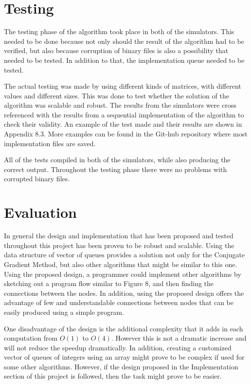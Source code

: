 \documentclass[12pt,a4paper]{article}
\begin{document}
\section{Testing}
The testing phase of the algorithm took place in both of the simulators. This needed to be done because not only should the result of the algorithm had to be verified, but also because corruption of binary files is also a possibility that needed to be tested. In addition to that, the implementation queue needed to be tested.

The actual testing was made by using different kinds of matrices, with different values and different sizes. This was done to test whether the solution of the algorithm was scalable and robust. The results from the simulators were cross referenced with the results from a sequential implementation of the algorithm to check their validity. An example of the test made and their results are shown in Appendix 8.3. More examples can be found in the Git-hub repository where most implementation files are saved\cite{git_repo}.

All of the tests compiled in both of the simulators, while also producing the correct output. Throughout the testing phase there were no problems with corrupted binary files.
\section{Evaluation}
In general the design and implementation that has been proposed and tested throughout this project has been proven to be robust and scalable. Using the data structure of vector of queues provides a solution not only for the Conjugate Gradient Method, but also other algorithms that might be similar to this one. Using the proposed design, a programmer could implement other algorithms by sketching out a program flow similar to Figure 8, and then finding the connections between the nodes. In addition, using the proposed design offers the advantage of few and understandable connections between nodes that can be easily produced using a simple program.

One disadvantage of the design is the additional complexity that it adds in each computation from $O(1)$ to $O(4)$. However this is not a dramatic increase and will not reduce the speedup dramatically. In addition, creating a customized vector of queues of integers using an array might prove to be complex if used for some other algorithms. However, if the design proposed in the Implementation section of this project is followed, then the task might prove to be easier.
\end{document}
